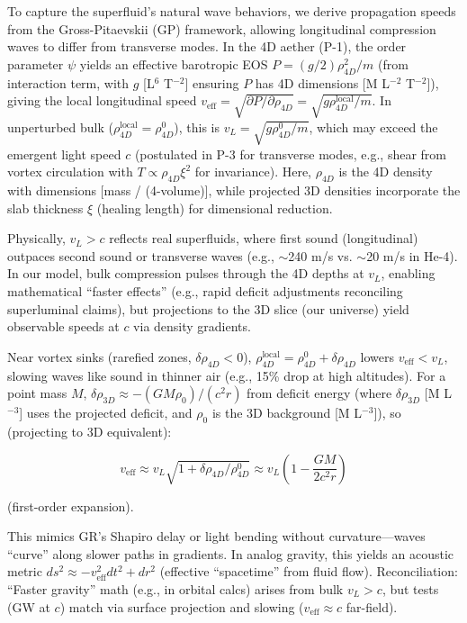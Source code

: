 \documentclass{article}
\begin{document}
To capture the superfluid's natural wave behaviors, we derive propagation speeds from the Gross-Pitaevskii (GP) framework, allowing longitudinal compression waves to differ from transverse modes. In the 4D aether (P-1), the order parameter $\psi$ yields an effective barotropic EOS $P = (g / 2) \rho_{4D}^2 / m$ (from interaction term, with $g$ [L$^6$ T$^{-2}$] ensuring $P$ has 4D dimensions [M L$^{-2}$ T$^{-2}$]), giving the local longitudinal speed $v_{\text{eff}} = \sqrt{\partial P / \partial \rho_{4D}} = \sqrt{g \rho_{4D}^{\text{local}} / m}$. In unperturbed bulk ($\rho_{4D}^{\text{local}} = \rho_{4D}^0$), this is $v_L = \sqrt{g \rho_{4D}^0 / m}$, which may exceed the emergent light speed $c$ (postulated in P-3 for transverse modes, e.g., shear from vortex circulation with $T \propto \rho_{4D} \xi^2$ for invariance). Here, $\rho_{4D}$ is the 4D density with dimensions [mass / (4-volume)], while projected 3D densities incorporate the slab thickness $\xi$ (healing length) for dimensional reduction.

Physically, $v_L > c$ reflects real superfluids, where first sound (longitudinal) outpaces second sound or transverse waves (e.g., $\sim$240 m/s vs. $\sim$20 m/s in He-4). In our model, bulk compression pulses through the 4D depths at $v_L$, enabling mathematical ``faster effects'' (e.g., rapid deficit adjustments reconciling superluminal claims), but projections to the 3D slice (our universe) yield observable speeds at $c$ via density gradients.

Near vortex sinks (rarefied zones, $\delta \rho_{4D} < 0$), $\rho_{4D}^{\text{local}} = \rho_{4D}^0 + \delta \rho_{4D}$ lowers $v_{\text{eff}} < v_L$, slowing waves like sound in thinner air (e.g., 15\% drop at high altitudes). For a point mass $M$, $\delta \rho_{3D} \approx - (G M \rho_0) / (c^2 r)$ from deficit energy (where $\delta \rho_{3D}$ [M L$^{-3}$] uses the projected deficit, and $\rho_0$ is the 3D background [M L$^{-3}$]), so (projecting to 3D equivalent):

\[
v_{\text{eff}} \approx v_L \sqrt{1 + \delta \rho_{4D} / \rho_{4D}^0} \approx v_L \left(1 - \frac{G M}{2 c^2 r}\right)
\]

(first-order expansion).

This mimics GR's Shapiro delay or light bending without curvature---waves ``curve'' along slower paths in gradients. In analog gravity, this yields an acoustic metric $ds^2 \approx - v_{\text{eff}}^2 dt^2 + dr^2$ (effective ``spacetime'' from fluid flow). Reconciliation: ``Faster gravity'' math (e.g., in orbital calcs) arises from bulk $v_L > c$, but tests (GW at $c$) match via surface projection and slowing ($v_{\text{eff}} \approx c$ far-field).
\end{document}
